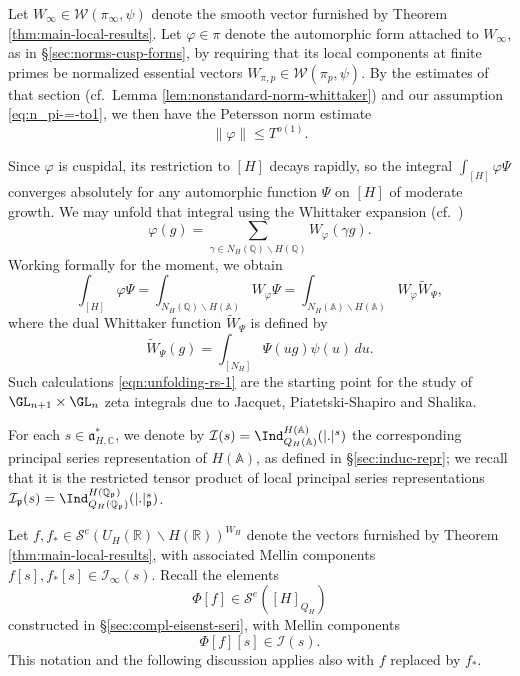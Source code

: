 Let $W_{\infty} \in \mathcal{W}(\pi_\infty, \psi)$ denote the smooth vector furnished by Theorem \ref{thm:main-local-results}.  Let $\varphi \in \pi$ denote the automorphic form attached to $W_{\infty}$, as in \S\ref{sec:norms-cusp-forms}, by requiring that its local components at finite primes be normalized essential vectors $W_{\pi,p} \in \mathcal{W}(\pi_p, \psi)$.  By the estimates of that section (cf.\ Lemma \ref{lem:nonstandard-norm-whittaker}) and our assumption \eqref{eq:n_pi-=-to1}, we then have the Petersson norm estimate
\begin{equation}\label{eq:varphi-2-asymp}
  \|\varphi \|
  \leq T^{o(1)}.
\end{equation}

Since $\varphi$ is cuspidal, its restriction to $[H]$ decays rapidly, so the integral $\int_{[H]} \varphi \Psi$ converges absolutely for any automorphic function $\Psi$ on $[H]$ of moderate growth.  We may unfold that integral using the Whittaker expansion (cf.\ \cite[Thm 5.9]{MR348047})
\begin{equation*}
  \varphi(g) = \sum_{\gamma \in N_H(\mathbb{Q}) \backslash H(\mathbb{Q})} W_\varphi(\gamma g).
\end{equation*}
Working formally for the moment, we obtain
\begin{equation}\label{eqn:unfolding-rs-1}
  \int_{[H]} \varphi \Psi
  =
  \int_{N_H(\mathbb{Q}) \backslash H(\mathbb{A})}
  W_\varphi \Psi
  =
  \int_{N_H(\mathbb{A}) \backslash H(\mathbb{A})}
  W_\varphi \tilde{W}_{\Psi},
\end{equation}
where the dual Whittaker function $\tilde{W}_{\Psi}$ is defined by
\begin{equation*}
  \tilde{W}_{\Psi}(g)
  = \int_{[N_H]}
  \Psi(u g) \psi(u ) \, d u.
\end{equation*}
Such calculations \eqref{eqn:unfolding-rs-1} are the starting point for the study of $\GL_{n+1} \times \GL_n$ zeta integrals due to Jacquet, Piatetski-Shapiro and Shalika.

For each $s \in \mathfrak{a}_{H,\mathbb{C}}^*$, we denote by $\mathcal{I}(s) = \Ind_{Q_H(\mathbb{A})}^{H(\mathbb{A})} (|.|^s)$ the corresponding principal series representation of $H(\mathbb{A})$, as defined in \S\ref{sec:induc-repr}; we recall that it is the restricted tensor product of local principal series representations $\mathcal{I}_\mathfrak{p}(s) = \Ind_{Q_H(\mathbb{Q}_\mathfrak{p})}^{H(\mathbb{Q}_\mathfrak{p})}(|.|_{\mathfrak{p}}^s)$.

Let $f, f_{\ast} \in \mathcal{S}^e(U_H(\mathbb{R}) \backslash H(\mathbb{R}))^{W_H}$ denote the vectors furnished by Theorem \ref{thm:main-local-results}, with associated Mellin components $f[s], f_{\ast}[s] \in \mathcal{I}_\infty(s)$.  Recall the elements
\begin{equation}\label{eq:phi-:=-phif}
  \Phi[f] \in \mathcal{S}^e([H]_{Q_H})
\end{equation}
constructed in \S\ref{sec:compl-eisenst-seri}, with Mellin components
\begin{equation*}
  \Phi[f][s] \in \mathcal{I}(s).
\end{equation*}
This notation and the following discussion applies also with $f$ replaced by $f_{\ast}$.

